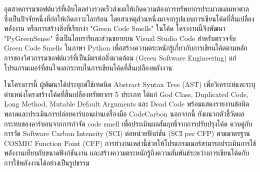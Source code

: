 \begin{abstractTH}

    อุตสาหกรรมซอฟต์แวร์ที่เติบโตอย่างรวดเร็วส่งผลให้เกิดความต้องการทรัพยากรประมวลผลมหาศาล ซึ่งเป็นปัจจัยหนึ่งที่ก่อให้เกิดภาวะโลกร้อน โดยสาเหตุส่วนหนึ่งมาจากรูปแบบการเขียนโค้ดที่สิ้นเปลืองพลังงาน หรือการสร้างสิ่งที่เรียกง่า "Green Code Smells" ในโค้ด โครงงานนี้จึงพัฒนา "PyGreenSense" ซึ่งเป็นไลบรารีและส่วนขยายบน Visual Studio Code สำหรับตรวจจับ Green Code Smells ในภาษา Python เพื่อสร้างความตระหนักรู้เกี่ยวกับการเขียนโค้ดตามหลักการของวิศวกรรมซอฟต์แวร์ที่เป็นมิตรต่อสิ่งแวดล้อม (Green Software Engineering) แก่โปรแกรมเมอร์ที่สนใจผลกระทบในการเขียนโค้ดที่สิ้นเปลืองพลังงาน

    ในโครงการนี้ ผู้พัฒนาได้ประยุกต์ใช้เทคนิค Abstract Syntax Tree (AST) เพื่อวิเคราะห์และระบุตำแหน่งโครงสร้างโค้ดที่สิ้นเปลืองทรัพยากร 5 ประเภท ได้แก่ God Class, Duplicated Code, Long Method, Mutable Default Arguments และ Dead Code พร้อมแสดงรายงานข้อผิดพลาดและประเมินการปล่อยคาร์บอนผ่านเครื่องมือ CodeCarbon นอกจากนี้ ยังผนวกตัวชี้วัดผลกระทบของคาร์บอนจากการกำจัด code smell เพื่อประเมินผลสัมฤทธิ์จากการปรับปรุงโค้ด ควบคู่กับการวัด Software Carbon Intensity (SCI) ต่อหน่วยฟังก์ชัน (SCI per CFP) ตามมาตรฐาน COSMIC Function Point (CFP) การทำงานเหล่านี้ช่วยให้โปรแกรมเมอร์สามารถประเมินการใช้พลังงานเทียบกับขนาดฟังก์ชันงาน และสร้างความตระหนักรู้ถึงความสัมพันธ์ระหว่างการเขียนโค้ดกับการใช้พลังงานได้อย่างเป็นรูปธรรม

\end{abstractTH}